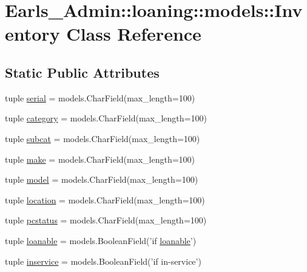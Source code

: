 \hypertarget{classEarls__Admin_1_1loaning_1_1models_1_1Inventory}{
\section{Earls\_\-Admin::loaning::models::Inventory Class Reference}
\label{classEarls__Admin_1_1loaning_1_1models_1_1Inventory}
}
\subsection*{Static Public Attributes}
\begin{CompactItemize}
\item 
tuple \hyperlink{classEarls__Admin_1_1loaning_1_1models_1_1Inventory_e61a757662fa746bbf01bc25e0eec5bc}{serial} = models.CharField(max\_\-length=100)
\item 
tuple \hyperlink{classEarls__Admin_1_1loaning_1_1models_1_1Inventory_a082b0a75479ea2ad2c8b785236e2db4}{category} = models.CharField(max\_\-length=100)
\item 
tuple \hyperlink{classEarls__Admin_1_1loaning_1_1models_1_1Inventory_d542515e0ee025b7e321621e92b3f41c}{subcat} = models.CharField(max\_\-length=100)
\item 
tuple \hyperlink{classEarls__Admin_1_1loaning_1_1models_1_1Inventory_6a5335b94805e8cf14904e5c4ec19363}{make} = models.CharField(max\_\-length=100)
\item 
tuple \hyperlink{classEarls__Admin_1_1loaning_1_1models_1_1Inventory_3d794aabeac9497fec46f59dd4d8bb9c}{model} = models.CharField(max\_\-length=100)
\item 
tuple \hyperlink{classEarls__Admin_1_1loaning_1_1models_1_1Inventory_2f7a98aa7f900588aebd4cb8ee070632}{location} = models.CharField(max\_\-length=100)
\item 
tuple \hyperlink{classEarls__Admin_1_1loaning_1_1models_1_1Inventory_58a03ca07346f2d346c9a6a5e9061bc7}{pcstatus} = models.CharField(max\_\-length=100)
\item 
tuple \hyperlink{classEarls__Admin_1_1loaning_1_1models_1_1Inventory_7684c24fbbe4aa3076ea2c49d8f217ef}{loanable} = models.BooleanField('if \hyperlink{classEarls__Admin_1_1loaning_1_1models_1_1Inventory_7684c24fbbe4aa3076ea2c49d8f217ef}{loanable}')
\item 
tuple \hyperlink{classEarls__Admin_1_1loaning_1_1models_1_1Inventory_065d22d6f328305f5b3ae87f961646de}{inservice} = models.BooleanField('if in-service')
\item 

\end{CompactItemize}

